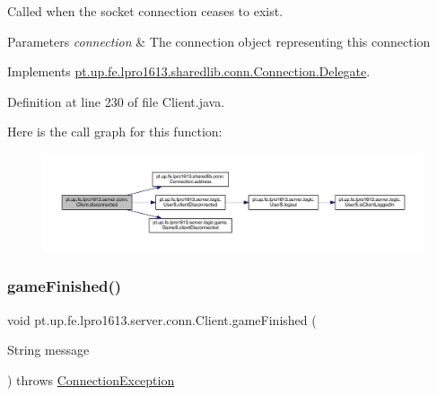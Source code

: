 Called when the socket connection ceases to exist.


\begin{DoxyParams}{Parameters}
{\em connection} & The connection object representing this connection \\
\hline
\end{DoxyParams}


Implements \hyperlink{interfacept_1_1up_1_1fe_1_1lpro1613_1_1sharedlib_1_1conn_1_1_connection_1_1_delegate_a39547a28a5b1818ca952e8d3d8da15ba}{pt.\+up.\+fe.\+lpro1613.\+sharedlib.\+conn.\+Connection.\+Delegate}.



Definition at line 230 of file Client.\+java.

Here is the call graph for this function\+:
\nopagebreak
\begin{figure}[H]
\begin{center}
\leavevmode
\includegraphics[width=350pt]{classpt_1_1up_1_1fe_1_1lpro1613_1_1server_1_1conn_1_1_client_a8aaec34bb1c5d5af0430318b105ac3fc_cgraph}
\end{center}
\end{figure}
\hypertarget{classpt_1_1up_1_1fe_1_1lpro1613_1_1server_1_1conn_1_1_client_a58789376953d4b6f316a48627dffbae1}{}\label{classpt_1_1up_1_1fe_1_1lpro1613_1_1server_1_1conn_1_1_client_a58789376953d4b6f316a48627dffbae1} 
\subsubsection{\texorpdfstring{game\+Finished()}{gameFinished()}}
{\footnotesize\ttfamily void pt.\+up.\+fe.\+lpro1613.\+server.\+conn.\+Client.\+game\+Finished (\begin{DoxyParamCaption}\item[{String}]{message }\end{DoxyParamCaption}) throws \hyperlink{classpt_1_1up_1_1fe_1_1lpro1613_1_1sharedlib_1_1exceptions_1_1_connection_exception}{Connection\+Exception}}


